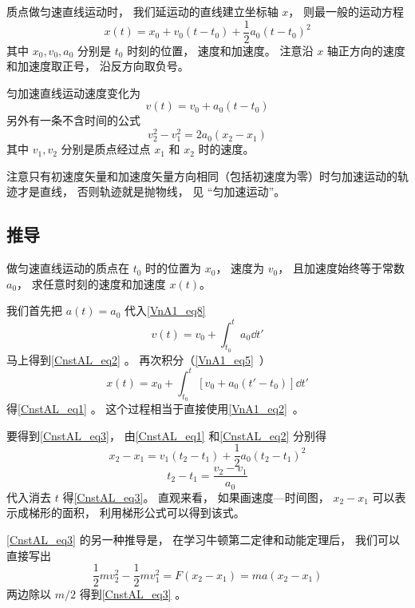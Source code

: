 

质点做匀速直线运动时， 我们延运动的直线建立坐标轴 $x$， 则最一般的运动方程
\begin{equation}\label{CnstAL_eq1}
x(t) = x_0 + v_0 (t - t_0) +  \frac12 a_0 (t - t_0)^2
\end{equation}
其中 $x_0, v_0, a_0$ 分别是 $t_0$ 时刻的位置， 速度和加速度。 注意沿 $x$ 轴正方向的速度和加速度取正号， 沿反方向取负号。

匀加速直线运动速度变化为
\begin{equation}\label{CnstAL_eq2}
v(t) = v_0 + a_0 (t - t_0)
\end{equation}
另外有一条不含时间的公式
\begin{equation}\label{CnstAL_eq3}
v_2^2 - v_1^2 = 2a_0 (x_2 - x_1)
\end{equation}
其中 $v_1, v_2$ 分别是质点经过点 $x_1$ 和 $x_2$ 时的速度。

注意只有初速度矢量和加速度矢量方向相同（包括初速度为零）时匀加速运动的轨迹才是直线， 否则轨迹就是抛物线， 见 “匀加速运动”。

\subsection{推导}
做匀速直线运动的质点在 $t_0$ 时的位置为 $x_0$， 速度为 $v_0$， 且加速度始终等于常数 $a_0$， 求任意时刻的速度和加速度 $x(t)$。

我们首先把 $a(t) = a_0$ 代入\autoref{VnA1_eq8}~
\begin{equation}
v(t) = v_0 + \int_{t_0}^t a_0 \dd{t'}
\end{equation}
马上得到\autoref{CnstAL_eq2} 。 再次积分（\autoref{VnA1_eq5}~）
\begin{equation}
x(t) = x_0 + \int_{t_0}^t [v_0 + a_0 (t' - t_0)] \dd{t'}
\end{equation}
得\autoref{CnstAL_eq1} 。 这个过程相当于直接使用\autoref{VnA1_eq2}~。

要得到\autoref{CnstAL_eq3}， 由\autoref{CnstAL_eq1} 和\autoref{CnstAL_eq2} 分别得
\begin{equation}
x_2 - x_1 = v_1 (t_2 - t_1) +  \frac12 a_0 (t_2 - t_1)^2
\end{equation}
\begin{equation}
t_2 - t_1 = \frac{v_2 - v_1}{a_0}
\end{equation}
代入消去 $t$ 得\autoref{CnstAL_eq3}。 直观来看， 如果画速度—时间图， $x_2 - x_1$ 可以表示成梯形的面积， 利用梯形公式可以得到该式。

\autoref{CnstAL_eq3} 的另一种推导是， 在学习牛顿第二定律和动能定理后， 我们可以直接写出
\begin{equation}
\frac{1}{2}mv_2^2 - \frac{1}{2}mv_1^2 = F (x_2 - x_1) = ma (x_2 - x_1)
\end{equation}
两边除以 $m/2$ 得到\autoref{CnstAL_eq3} 。
